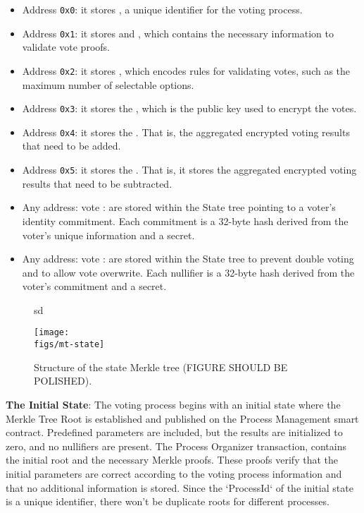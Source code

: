 \begin{itemize}
	\item Address \texttt{0x0}: it stores \processid, a unique identifier for the voting process.
	\item Address \texttt{0x1}: it stores \censusroot and \type, which contains the necessary information to validate vote proofs.
	\item Address \texttt{0x2}: it stores \ballotmode, which encodes rules for validating votes, such as the maximum number of selectable options.
	\item Address \texttt{0x3}: it stores the \epk, which is the public key used to encrypt the votes.
	\item Address \texttt{0x4}: it stores the \addaccumulator. That is, the aggregated encrypted voting results that need to be added.
	\item Address \texttt{0x5}: it stores the \substractaccumulator. That is, it stores the aggregated encrypted voting results that need to be subtracted.
	\item Any address: vote \addresses: are stored within the State tree pointing to a voter's identity commitment. Each commitment is a 32-byte hash derived from the voter's unique information and a secret.
	\item Any address: vote \nullifiers: are stored within the State tree to prevent double voting and to allow vote overwrite. Each nullifier is a 32-byte hash derived from the voter's commitment and a secret.
\end{itemize}


\begin{figure}[h]
sd	\centerline{\texttt{[image: \\figs/mt-state]}}
	\caption{Structure of the state Merkle tree (FIGURE SHOULD BE POLISHED).}
	\label{fig:mt-state}
\end{figure}

\textbf{The Initial State}: The voting process begins with an initial state where the Merkle Tree Root is established and published on the Process Management smart contract. Predefined parameters are included, but the results are initialized to zero, and no nullifiers are present. The Process Organizer transaction, contains the initial root and the necessary Merkle proofs. These proofs verify that the initial parameters are correct according to the voting process information and that no additional information is stored. Since the `ProcessId` of the initial state is a unique identifier, there won't be duplicate roots for different processes.


